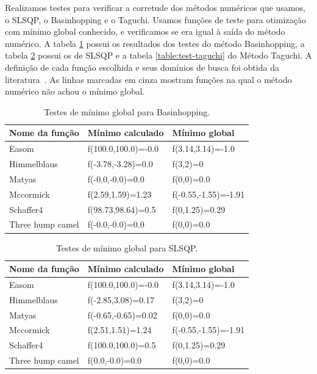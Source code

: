 \documentclass[]{politex}
\begin{document}
Realizamos testes para verificar a corretude dos métodos numéricos que usamos, o
SLSQP, o Basinhopping e o Taguchi. Usamos funções de teste para otimização com
mínimo global conhecido, e verificamos se era igual à saída do método numérico.
A tabela \ref{table:test-bh} possui os resultados dos testes do método
Basinhopping, a tabela \ref{table:test-slsqp} possui os de SLSQP e a tabela
\ref{table:test-taguchi} do Método Taguchi. A definição de cada função escolhida
e seus domínios de busca foi obtida da literatura~\cite{optimization-functions}.
As linhas marcadas em cinza mostram funções na qual o método numérico não achou
o mínimo global.

\begin{table}[H]
\centering
\begin{tabular}{l|l|l}
 Nome da função & Mínimo calculado & Mínimo global \\ \hline
\rowcolor{Gray}
Easom  &  f(100.0,100.0)=-0.0  &  f(3.14,3.14)=-1.0 \\
Himmelblaus  &  f(-3.78,-3.28)=0.0  &  f(3,2)=0 \\
Matyas  &  f(-0.0,-0.0)=0.0  &  f(0,0)=0.0 \\
\rowcolor{Gray}
Mccormick  &  f(2.59,1.59)=1.23  &  f(-0.55,-1.55)=-1.91 \\
\rowcolor{Gray}
Schaffer4  &  f(98.73,98.64)=0.5  &  f(0,1.25)=0.29 \\
Three hump camel  &  f(-0.0,-0.0)=0.0  &  f(0,0)=0.0 \\
\end{tabular}
\caption{Testes de mínimo global para Basinhopping.}
\label{table:test-bh}
\end{table}

\begin{table}[H]
\centering
\begin{tabular}{l|l|l}
 Nome da função & Mínimo calculado & Mínimo global \\ \hline
\rowcolor{Gray}
Easom  &  f(100.0,100.0)=-0.0  &  f(3.14,3.14)=-1.0 \\
\rowcolor{Gray}
Himmelblaus  &  f(-2.85,3.08)=0.17  &  f(3,2)=0 \\
\rowcolor{Gray}
Matyas  &  f(-0.65,-0.65)=0.02  &  f(0,0)=0.0 \\
\rowcolor{Gray}
Mccormick  &  f(2.51,1.51)=1.24  &  f(-0.55,-1.55)=-1.91 \\
\rowcolor{Gray}
Schaffer4  &  f(100.0,100.0)=0.5  &  f(0,1.25)=0.29 \\
Three hump camel  &  f(0.0,-0.0)=0.0  &  f(0,0)=0.0 \\
\end{tabular}
\caption{Testes de mínimo global para SLSQP.}
\label{table:test-slsqp}
\end{table}
\end{document}
